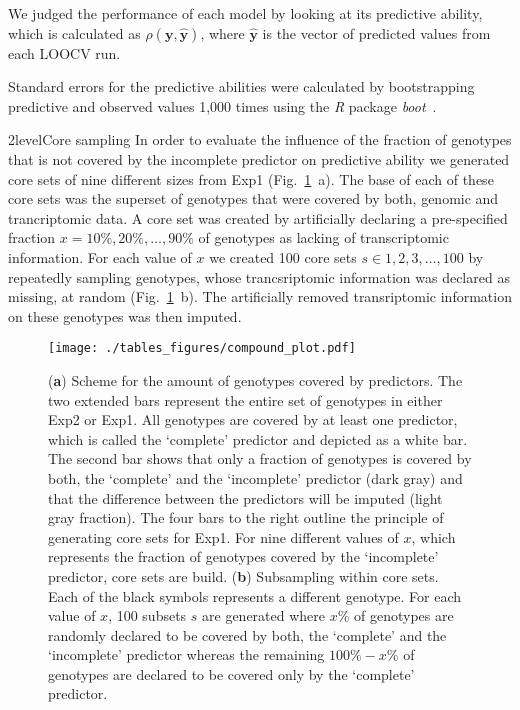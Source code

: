 \documentclass[12pt,titlepage]{article}
\begin{document}
We judged the performance of each model by looking at its predictive ability,
which is calculated as $\rho(\mathbf{y}, \mathbf{\hat{y}})$, where 
$\mathbf{\hat{y}}$ is the vector of predicted values from each LOOCV run.

Standard errors for the predictive abilities were calculated by bootstrapping
predictive and observed values 1,000 times using the \emph{R} package 
\emph{boot}~\cite{Canty2017}.



\Genetics2level{Core sampling}
In order to evaluate the influence of the fraction of genotypes that is not
covered by the incomplete predictor on predictive ability we generated core
sets of nine different sizes from Exp1 (Fig.~\ref{fig:compound-plot}~a).
The base of each of these core sets was the superset of genotypes that were
covered by both, genomic and trancriptomic data.
A core set was created by artificially declaring a pre-specified fraction 
$x = {10\%, 20\%, \dots, 90\%}$ of genotypes as lacking of transcriptomic 
information.
For each value of $x$ we created 100 core sets $s \in {1, 2, 3, \dots, 100}$ by
repeatedly sampling genotypes, whose trancsriptomic information was declared
as missing, at random (Fig.~\ref{fig:compound-plot}~b).
The artificially removed transriptomic information on these genotypes was then
imputed.

\begin{figure}[H]
  \centering
  \texttt{[image: ./tables\_figures/compound\_plot.pdf]}
  \caption{
  (\textbf{a}) Scheme for the amount of genotypes covered by predictors.
  The two extended bars represent the entire set of genotypes in either
  Exp2 or Exp1.
  All genotypes are covered by at least one predictor, which is called the
  `complete' predictor and depicted as a white bar.
  The second bar shows that only a fraction of genotypes is covered by both,
  the `complete' and the `incomplete' predictor (dark gray) and that the
  difference between the predictors will be imputed (light gray fraction).
  The four bars to the right outline the principle of generating core sets for
  Exp1.
  For nine different values of $x$, which represents the fraction of genotypes
  covered by the `incomplete' predictor, core sets are build.
  (\textbf{b}) Subsampling within core sets.
  Each of the black symbols represents a different genotype.
  For each value of $x$, 100 subsets $s$ are generated where $x\%$ of genotypes
  are randomly declared to be covered by both, the `complete' and the
  `incomplete' predictor whereas the remaining $100\% - x\%$ of genotypes
  are declared to be covered only by the `complete' predictor.
  }
\label{fig:compound-plot}
\end{figure}
\end{document}
